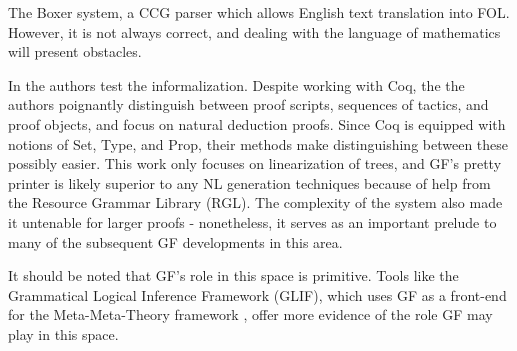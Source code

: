The Boxer system, a CCG parser \cite{bos-etal-2004-wide} which allows English
text translation into FOL. However, it is not always correct, and dealing with
the language of mathematics will present obstacles. 

In \cite{proofFrom} the authors test the informalization. Despite working with
Coq, the the authors poignantly distinguish between proof scripts, sequences of
tactics, and proof objects, and focus on natural deduction proofs. Since Coq is
equipped with notions of Set, Type, and Prop, their methods make distinguishing
between these possibly easier. This work only focuses on linearization of trees,
and GF's pretty printer is likely superior to any NL generation techniques
because of help from the Resource Grammar Library (RGL). The complexity of the system also made it
untenable for larger proofs - nonetheless, it serves as an important prelude to
many of the subsequent GF developments in this area.

It should be noted that GF's role in this space is primitive. Tools like the
Grammatical Logical Inference Framework (GLIF), which uses GF as a front-end for
the Meta-Meta-Theory framework \cite{schaefer2020glif}, offer more evidence of
the role GF may play in this space.
